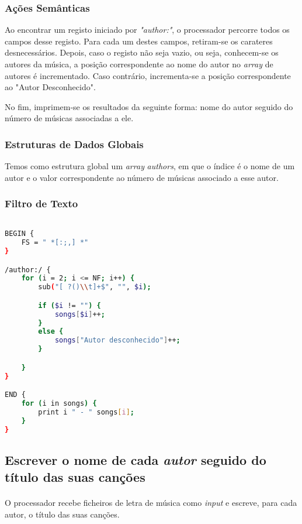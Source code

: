 \documentclass{article}
\begin{document}
\subsubsection{Ações Semânticas}

Ao encontrar um registo iniciado por \emph{"author:"}, o processador percorre todos os campos desse registo. Para cada um destes campos, retiram-se os carateres desnecessários. Depois, caso o registo não seja vazio, ou seja, conhecem-se os autores da música, a posição correspondente ao nome do autor no \emph{array} de autores é incrementado. Caso contrário, incrementa-se a posição correspondente ao "Autor Desconhecido".

No fim, imprimem-se os resultados da seguinte forma: nome do autor seguido do número de músicas associadas a ele.

\subsubsection{Estruturas de Dados Globais}

Temos como estrutura global um \emph{array} \emph{authors}, em que o índice é o nome de um autor e o valor correspondente ao número de músicas associado a esse autor. 

\subsubsection{Filtro de Texto}

\begin{lstlisting}[language=bash]

BEGIN {
	FS = " *[:;,] *"
}

/author:/ {
	for (i = 2; i <= NF; i++) {
		sub("[ ?()\\t]+$", "", $i);

		if ($i != "") {
			songs[$i]++;
		}
		else {
			songs["Autor desconhecido"]++;
		}

	}
}

END {
	for (i in songs) {
		print i " - " songs[i];
	}
}

\end{lstlisting}


\subsection{Escrever o nome de cada \emph{autor} seguido do título das suas canções}

\paragraph{} O processador recebe ficheiros de letra de música como \emph{input} e escreve, para cada autor, o título das suas canções.
\end{document}
